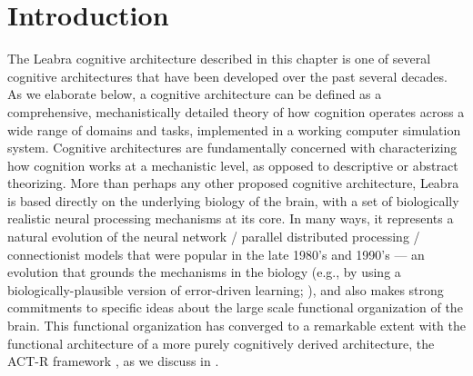 \documentclass[11pt,twoside]{article}
\begin{document}



 
\titlesamepageoc{\mytitle}{\myauthor}{\mynote}{\myabstract}



\pagestyle{myheadings}

\newpage

\section{Introduction}

The Leabra cognitive architecture described in this chapter is one of several
cognitive architectures that have been developed over the past several
decades.  As we elaborate below, a cognitive architecture can be defined as a
comprehensive, mechanistically detailed theory of how cognition operates
across a wide range of domains and tasks, implemented in a working
computer simulation system.  Cognitive architectures are fundamentally
concerned with characterizing how cognition works at a mechanistic level, as
opposed to descriptive or abstract theorizing.  More than perhaps any other
proposed cognitive architecture, Leabra is based directly on the underlying
biology of the brain, with a set of biologically realistic neural processing
mechanisms at its core.  In many ways, it represents a natural evolution of
the neural network / parallel distributed processing / connectionist models
that were popular in the late 1980's and 1990's --- an evolution that grounds
the mechanisms in the biology (e.g., by using a biologically-plausible version
of error-driven learning; ), and
also makes strong commitments to specific ideas about the large scale
functional organization of the brain.  This functional organization has
converged to a remarkable extent with the functional architecture of a more
purely cognitively derived architecture, the ACT-R framework
\cite{AndersonBothellByrneEtAl04}, as we discuss in .
\end{document}
